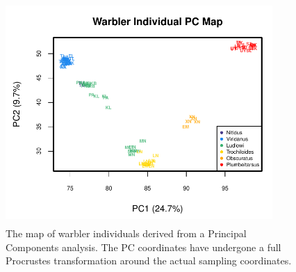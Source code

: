\documentclass[12pt]{article}
\begin{document}
\begin{figure}
	\centering
	\includegraphics[width=4in,height=3.33in]{figs/warblers/warb_ind_PC_map.pdf}
	\caption{The map of warbler individuals derived from a Principal Components analysis.  The PC coordinates have undergone a full Procrustes transformation around the actual sampling coordinates.}
	\label{sfig:warb_ind_PC_map}
\end{figure}
\end{document}
